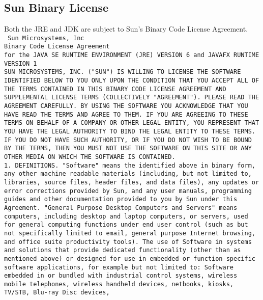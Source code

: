 \subsection{Sun Binary License}

\noindent
Both the JRE and JDK are subject to Sun's Binary Code License Agreement.
\\

\setlength{\baselineskip}{0.5\oldbaselineskip}
{\tiny\tt
\noindent
Sun Microsystems, Inc
\\
Binary Code License Agreement
\\
for the JAVA SE RUNTIME ENVIRONMENT (JRE) VERSION 6 and JAVAFX RUNTIME VERSION 1
\\[4pt]
SUN MICROSYSTEMS, INC. ("SUN") IS WILLING TO LICENSE THE SOFTWARE
IDENTIFIED BELOW TO YOU ONLY UPON THE CONDITION THAT YOU ACCEPT ALL OF
THE TERMS CONTAINED IN THIS BINARY CODE LICENSE AGREEMENT AND
SUPPLEMENTAL LICENSE TERMS (COLLECTIVELY "AGREEMENT"). PLEASE READ THE
AGREEMENT CAREFULLY. BY USING THE SOFTWARE YOU ACKNOWLEDGE THAT YOU
HAVE READ THE TERMS AND AGREE TO THEM. IF YOU ARE AGREEING TO THESE
TERMS ON BEHALF OF A COMPANY OR OTHER LEGAL ENTITY, YOU REPRESENT THAT
YOU HAVE THE LEGAL AUTHORITY TO BIND THE LEGAL ENTITY TO THESE
TERMS. IF YOU DO NOT HAVE SUCH AUTHORITY, OR IF YOU DO NOT WISH TO BE
BOUND BY THE TERMS, THEN YOU MUST NOT USE THE SOFTWARE ON THIS SITE OR
ANY OTHER MEDIA ON WHICH THE SOFTWARE IS CONTAINED.
\\[4pt]
   1. DEFINITIONS. "Software" means the identified above in binary
   form, any other machine readable materials (including, but not
   limited to, libraries, source files, header files, and data files),
   any updates or error corrections provided by Sun, and any user
   manuals, programming guides and other documentation provided to you
   by Sun under this Agreement. "General Purpose Desktop Computers and
   Servers" means computers, including desktop and laptop computers,
   or servers, used for general computing functions under end user
   control (such as but not specifically limited to email, general
   purpose Internet browsing, and office suite productivity
   tools). The use of Software in systems and solutions that provide
   dedicated functionality (other than as mentioned above) or designed
   for use in embedded or function-specific software applications, for
   example but not limited to: Software embedded in or bundled with
   industrial control systems, wireless mobile telephones, wireless
   handheld devices, netbooks, kiosks, TV/STB, Blu-ray Disc devices,
}
